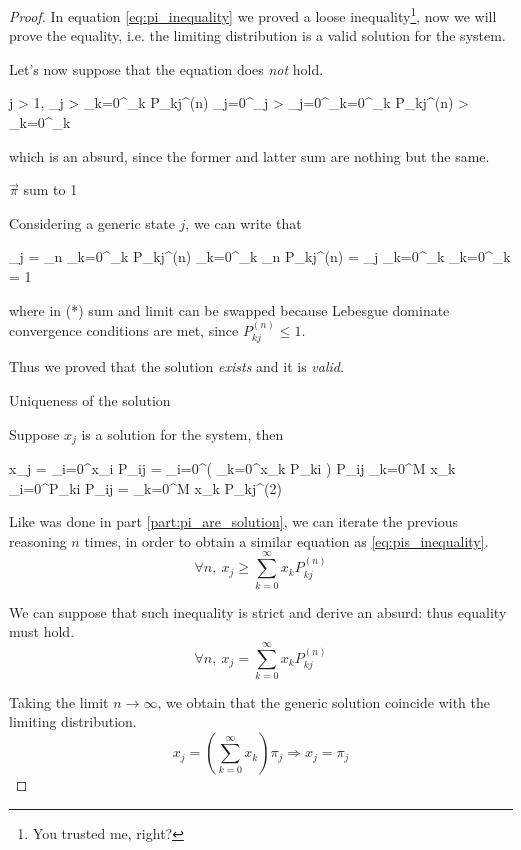 \begin{proof}
			In equation \ref{eq:pi_inequality} we proved a loose inequality\footnote{You trusted me, right?}, now we will prove the equality, i.e. the limiting distribution is a valid solution for the system.

			Let's now suppose that the equation does \emph{not} hold.
			\begin{esp*}
				\exists j > 1, \pi_j > \sum_{k=0}^\infty \pi_k P_{kj}^{(n)}
				\implies \sum_{j=0}^\infty \pi_j > \sum_{j=0}^\infty \sum_{k=0}^\infty \pi_k P_{kj}^{(n)} > \sum_{k=0}^\infty \pi_k
			\end{esp*}
			which is an absurd, since the former and latter sum are nothing but the same.

		\proofpart $\vec{\pi}$ sum to 1

			Considering a generic state $j$, we can write that
			\begin{esp*}
				\pi_j
					= \lim_{n \to \infty} \sum_{k=0}^\infty \pi_k P_{kj}^{(n)}
					\stackrel{(*)}{=} \sum_{k=0}^\infty  \pi_k \lim_{n\to\infty} P_{kj}^{(n)} = \pi_j \sum_{k=0}^\infty \pi_k
				 \implies \sum_{k=0}^\infty \pi_k = 1
			\end{esp*}
			where in (*) sum and limit can be swapped because Lebesgue dominate convergence conditions are met, since $P_{kj}^{(n)} \le 1$.

			Thus we proved that the solution \emph{exists} and it is \emph{valid}.

		\proofpart Uniqueness of the solution

			Suppose $x_j$ is a solution for the system, then
			\begin{esp*}
				x_j
					= \sum_{i=0}^\infty x_i P_{ij}
					= \sum_{i=0}^\infty \left( \sum_{k=0}^\infty x_k P_{ki} \right) P_{ij}
					\geq \sum_{k=0}^M x_k \sum_{i=0}^\infty P_{ki} P_{ij}
					= \sum_{k=0}^M x_k P_{kj}^{(2)}
			\end{esp*}

			Like was done in part \ref{part:pi_are_solution}, we can iterate the previous reasoning $n$ times, in order to obtain a similar equation as \ref{eq:pis_inequality}.
			\begin{equation*}
				\forall n,~ x_j \geq \sum_{k=0}^\infty x_k P_{kj}^{(n)}
			\end{equation*}

			We can suppose that such inequality is strict and derive an absurd: thus equality must hold.
			\begin{equation*}
				\forall n,~ x_j = \sum_{k=0}^\infty x_k P_{kj}^{(n)}
			\end{equation*}

			Taking the limit $n \to \infty$, we obtain that the generic solution coincide with the limiting distribution.
			\begin{equation*}
				x_j = \left( \sum_{k=0}^\infty x_k \right) \pi_j \Rightarrow x_j = \pi_j
			\end{equation*}
	\end{proof}

